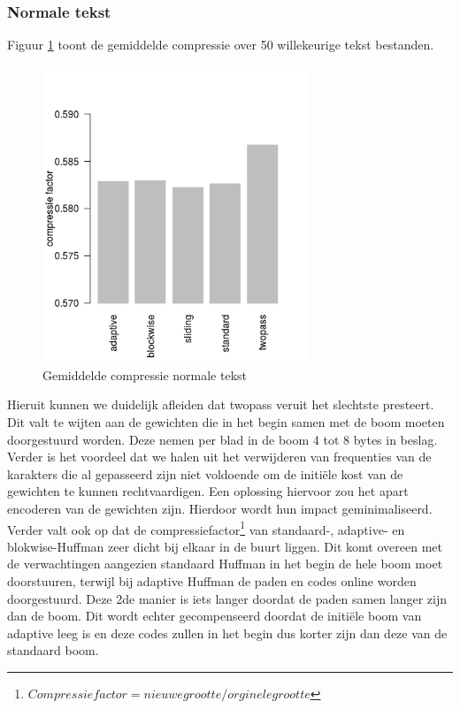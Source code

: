 \documentclass[twoside,twocolumn]{article}
\begin{document}
        \subsubsection{Normale tekst} \label{3}
            Figuur \ref{compressie1} toont de gemiddelde compressie over 50 willekeurige tekst bestanden.
            \begin{figure}[H]
                \begin{center}
                    \includegraphics[width=8cm]{images/compressie-tekst.png}    
                \end{center}
                \caption{Gemiddelde compressie normale tekst}
                \label{compressie1}

            \end{figure}
            Hieruit kunnen we duidelijk afleiden dat twopass veruit het slechtste presteert.
            Dit valt te wijten aan de gewichten die in het begin samen met de boom moeten doorgestuurd worden. Deze nemen per blad in de boom 4 tot 8 bytes in beslag. Verder is het voordeel dat we halen uit het verwijderen van frequenties van de karakters die al gepasseerd zijn niet voldoende om de initiële kost van de gewichten te kunnen rechtvaardigen. Een oplossing hiervoor zou het apart encoderen van de gewichten zijn. Hierdoor wordt hun impact geminimaliseerd.
            Verder valt ook op dat de compressiefactor\footnote{$Compressiefactor=nieuwegrootte/orginele grootte$} van standaard-, adaptive- en blokwise-Huffman zeer dicht bij elkaar in de buurt liggen.
            Dit komt overeen met de verwachtingen aangezien standaard Huffman in het begin de hele boom moet doorstuuren, terwijl bij adaptive Huffman de paden en codes online worden doorgestuurd. Deze 2de manier is iets langer doordat de paden samen langer zijn dan de boom. Dit wordt echter gecompenseerd doordat de initiële boom van adaptive leeg is en deze codes zullen in het begin dus korter zijn dan deze van de standaard boom. 
\end{document}
